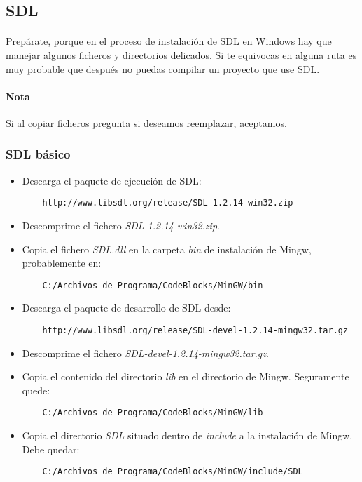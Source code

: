 \documentclass[16pt,spanish]{article}
\begin{document}
\subsection{SDL}

\paragraph{}
Prepárate, porque en el proceso de instalación de SDL en Windows hay que manejar
algunos ficheros y directorios delicados. Si te equivocas en alguna ruta es muy
probable que después no puedas compilar un proyecto que use SDL.

\paragraph{Nota}
Si al copiar ficheros pregunta si deseamos reemplazar, aceptamos.

\subsubsection{SDL básico}

\begin{itemize}
	\item Descarga el paquete de ejecución de SDL:
	\begin{verbatim}
	http://www.libsdl.org/release/SDL-1.2.14-win32.zip
	\end{verbatim}
	\item Descomprime el fichero \emph{SDL-1.2.14-win32.zip}.
	\item Copia el fichero \emph{SDL.dll} en la carpeta \emph{bin} de instalación
	de Mingw, probablemente en:
	\begin{verbatim}
	C:/Archivos de Programa/CodeBlocks/MinGW/bin
	\end{verbatim}
	\item Descarga el paquete de desarrollo de SDL desde:
	\begin{verbatim}
	http://www.libsdl.org/release/SDL-devel-1.2.14-mingw32.tar.gz
	\end{verbatim}
	\item Descomprime el fichero \emph{SDL-devel-1.2.14-mingw32.tar.gz}.
	\item Copia el contenido del directorio \emph{lib} en el directorio
	de Mingw. Seguramente quede:
	\begin{verbatim}
	C:/Archivos de Programa/CodeBlocks/MinGW/lib
	\end{verbatim}
	\item Copia el directorio \emph{SDL} situado dentro de \emph{include}
	a la instalación de Mingw. Debe quedar:
	\begin{verbatim}
	C:/Archivos de Programa/CodeBlocks/MinGW/include/SDL
	\end{verbatim}
\end{itemize}
\end{document}
